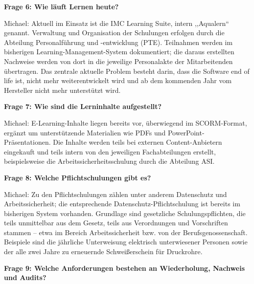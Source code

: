 \documentclass[
    12pt, 
    a4paper,
    ]{scrartcl} %
\begin{document}
\bigskip
{}

\textbf{Frage 6: Wie l\"auft Lernen heute?}

Michael: Aktuell im Einsatz ist die IMC Learning Suite, intern ,,Aqualern`` genannt. Verwaltung und Organisation der Schulungen erfolgen durch die Abteilung Personalf\"uhrung und -entwicklung (PTE). Teilnahmen werden im bisherigen Learning-Management-System dokumentiert; die daraus erstellten Nachweise werden von dort in die jeweilige Personalakte der Mitarbeitenden \"ubertragen. Das zentrale aktuelle Problem besteht darin, dass die Software end of life ist, nicht mehr weiterentwickelt wird und ab dem kommenden Jahr vom Hersteller nicht mehr unterst\"utzt wird.

\medskip
\textbf{Frage 7: Wie sind die Lerninhalte aufgestellt?}

Michael: E-Learning-Inhalte liegen bereits vor, \"uberwiegend im SCORM-Format, erg\"anzt um unterst\"utzende Materialien wie PDFs und PowerPoint-Pr\"asentationen. Die Inhalte werden teils bei externen Content-Anbietern eingekauft und teils intern von den jeweiligen Fachabteilungen erstellt, beispielsweise die Arbeitssicherheitsschulung durch die Abteilung ASI.

\bigskip
{}

\textbf{Frage 8: Welche Pflichtschulungen gibt es?}

Michael: Zu den Pflichtschulungen z\"ahlen unter anderem Datenschutz und Arbeitssicherheit; die entsprechende Datenschutz-Pflichtschulung ist bereits im bisherigen System vorhanden. Grundlage sind gesetzliche Schulungspflichten, die teils unmittelbar aus dem Gesetz, teils aus Verordnungen und Vorschriften stammen -- etwa im Bereich Arbeitssicherheit bzw. von der Berufsgenossenschaft. Beispiele sind die j\"ahrliche Unterweisung elektrisch unterwiesener Personen sowie der alle zwei Jahre zu erneuernde Schwei{\ss}erschein f\"ur Druckrohre.

\medskip
\textbf{Frage 9: Welche Anforderungen bestehen an Wiederholung, Nachweis und Audits?}
\end{document}
